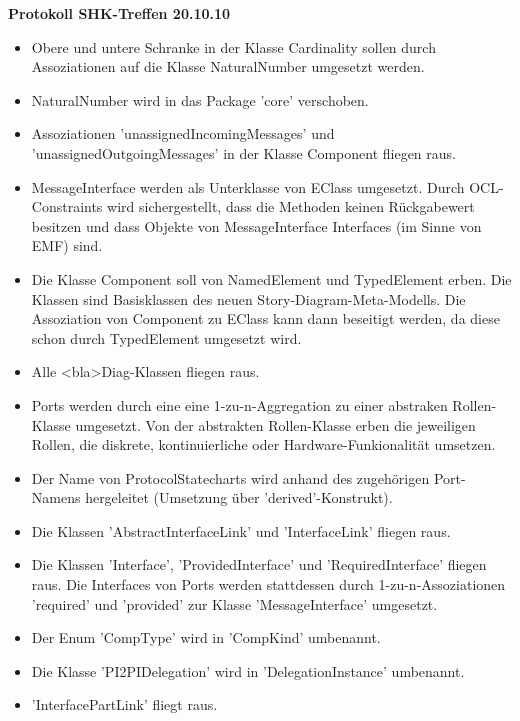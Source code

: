 \documentclass[11pt,a4paper]{article}
\begin{document}
\begin{center}

\textbf{\huge Protokoll SHK-Treffen 20.10.10}\\[0.9cm]

\end{center}

\begin{itemize}
\item  Obere und untere Schranke in der Klasse Cardinality sollen durch Assoziationen auf die Klasse NaturalNumber umgesetzt werden.
\item  NaturalNumber wird in das Package 'core' verschoben.
\item  Assoziationen 'unassignedIncomingMessages' und
'unassignedOutgoingMessages' in der Klasse Component fliegen raus.
\item  MessageInterface werden als Unterklasse von EClass umgesetzt. Durch OCL-Constraints wird sichergestellt, dass die Methoden keinen Rückgabewert besitzen und dass Objekte von MessageInterface Interfaces (im Sinne von EMF) sind.
\item  Die Klasse Component soll von NamedElement und TypedElement erben. Die Klassen sind Basisklassen des neuen Story-Diagram-Meta-Modells. Die Assoziation von Component zu EClass kann dann beseitigt werden, da diese schon durch TypedElement umgesetzt wird.
\item  Alle <bla>Diag-Klassen fliegen raus.
\item  Ports werden durch eine eine 1-zu-n-Aggregation zu einer abstraken Rollen-Klasse umgesetzt. Von der abstrakten Rollen-Klasse erben die jeweiligen Rollen, die diskrete, kontinuierliche oder Hardware-Funkionalität umsetzen.
\item  Der Name von ProtocolStatecharts wird anhand des zugehörigen Port-Namens hergeleitet (Umsetzung über 'derived'-Konstrukt).
\item  Die Klassen 'AbstractInterfaceLink' und 'InterfaceLink' fliegen raus.
\item  Die Klassen 'Interface', 'ProvidedInterface' und 'RequiredInterface' fliegen raus. Die Interfaces von Ports werden stattdessen durch 1-zu-n-Assoziationen 'required' und 'provided' zur Klasse 'MessageInterface' umgesetzt.
\item  Der Enum 'CompType' wird in 'CompKind' umbenannt.
\item  Die Klasse 'PI2PIDelegation' wird in 'DelegationInstance' umbenannt.
\item  'InterfacePartLink' fliegt raus.
\end{itemize}
\end{document}
